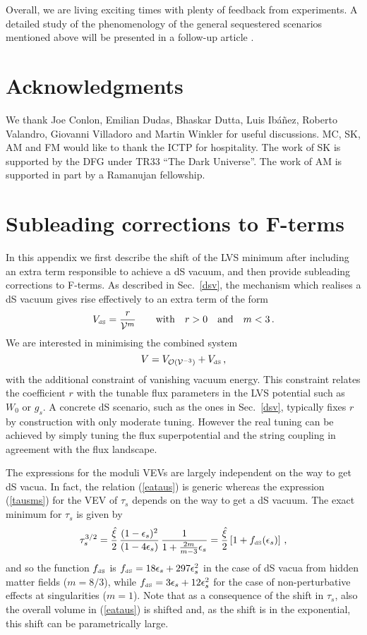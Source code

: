 \documentclass[11pt,a4paper]{article}
\newcommand{\be}{\begin{equation}}
\newcommand{\ee}{\end{equation}}
\def\dS{{\scriptscriptstyle \rm dS}}
\newcommand\vo{{\mathcal{V}}}
\newcommand{\mc}{\mathcal}
\begin{document}
Overall, we are living exciting times with plenty of feedback from experiments. A detailed study of the phenomenology of the general sequestered scenarios mentioned above will be presented in a follow-up article \cite{us}.

\section*{Acknowledgments}

We thank Joe Conlon, Emilian Dudas, Bhaskar Dutta, Luis Ib\'a\~nez, Roberto Valandro, Giovanni Villadoro and Martin Winkler for useful discussions.
MC, SK, AM and FM  would like to thank the ICTP for hospitality.
The work of SK is supported by the DFG under TR33 ``The Dark Universe''. The work of AM is supported in part by a Ramanujan fellowship.



\appendix


\section{Subleading corrections to F-terms}
\label{App}

In this appendix we first describe the shift of the LVS minimum after including an extra term responsible to achieve a dS vacuum,
and then provide subleading corrections to F-terms. As described in Sec.~\ref{dsv}, the mechanism which realises a dS vacuum gives rise effectively to an extra term of the form
\be
V_\dS=\frac{r}{\vo^m}\qquad\text{with}\quad r>0\quad\text{and}\quad m<3\,.
\ee
We are interested in minimising the combined system
\be
V=V_{\mc{O}(\vo^{-3})}+V_\dS\,,
\ee
with the additional constraint of vanishing vacuum energy. This constraint relates the coefficient $r$ with the tunable flux parameters in the LVS potential such as $W_0$ or $g_s$. A concrete dS scenario, such as the ones in Sec.~\ref{dsv}, typically fixes $r$ by construction with only moderate tuning. However the real tuning can be achieved by simply tuning the flux superpotential and the string coupling in agreement with the flux landscape.

The expressions for the moduli VEVs are largely independent on the way to get dS vacua.
In fact, the relation (\ref{eataus}) is generic whereas the expression (\ref{tausms}) for the VEV of $\tau_s$
depends on the way to get a dS vacuum. The exact minimum for $\tau_s$ is given by
\be
\tau_s^{3/2}=\frac{\hat{\xi}}{2}\, \frac{(1-\epsilon_s)^2}{(1-4\epsilon_s)}\, \frac{1}{1+\frac{2m}{m-3} \epsilon_s}
=\frac{\hat{\xi}}{2}\left[1+f_\dS(\epsilon_s)\right]\,,
\label{eq:shiftds}
\ee
and so the function $f_\dS$ is $f_\dS= 18 \epsilon_s+297 \epsilon_s^2$ in the case of dS vacua from hidden matter fields ($m=8/3$),
while $f_\dS=3 \epsilon_s+12 \epsilon_s^2$ for the case of non-perturbative effects at singularities ($m=1$).
Note that as a consequence of the shift in $\tau_s$, also the overall volume in (\ref{eataus}) is shifted and, as the shift is in the exponential,
this shift can be parametrically large.
\end{document}
